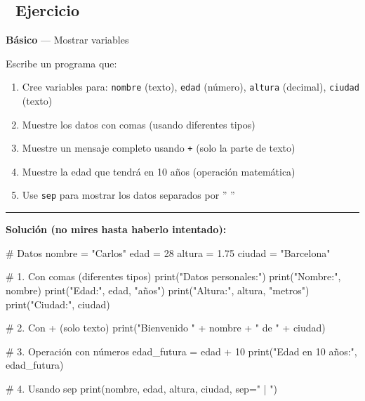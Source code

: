 \documentclass[
  doc,
  floatsintext,
  longtable,
  a4paper,
  nolmodern,
  notxfonts,
  notimes,
  12pt,
  colorlinks=true,linkcolor=blue,citecolor=blue,urlcolor=blue]{apa7}
\newenvironment{Shaded}{\begin{snugshade}}{\end{snugshade}}
\newcommand{\BuiltInTok}[1]{\textcolor[rgb]{0.00,0.23,0.31}{#1}}
\newcommand{\CommentTok}[1]{\textcolor[rgb]{0.37,0.37,0.37}{#1}}
\newcommand{\DecValTok}[1]{\textcolor[rgb]{0.68,0.00,0.00}{#1}}
\newcommand{\FloatTok}[1]{\textcolor[rgb]{0.68,0.00,0.00}{#1}}
\newcommand{\NormalTok}[1]{\textcolor[rgb]{0.00,0.23,0.31}{#1}}
\newcommand{\OperatorTok}[1]{\textcolor[rgb]{0.37,0.37,0.37}{#1}}
\newcommand{\StringTok}[1]{\textcolor[rgb]{0.13,0.47,0.30}{#1}}
\providecommand{\tightlist}{%
  \setlength{\itemsep}{0pt}\setlength{\parskip}{0pt}}
\begin{document}
\subsection{📝 Ejercicio}\label{ejercicio}

\textbf{Básico} --- Mostrar variables

Escribe un programa que:

\begin{enumerate}
\def\labelenumi{\arabic{enumi}.}
\tightlist
\item
  Cree variables para: \texttt{nombre} (texto), \texttt{edad} (número),
  \texttt{altura} (decimal), \texttt{ciudad} (texto)
\item
  Muestre los datos con comas (usando diferentes tipos)
\item
  Muestre un mensaje completo usando \texttt{+} (solo la parte de texto)
\item
  Muestre la edad que tendrá en 10 años (operación matemática)
\item
  Use \texttt{sep} para mostrar los datos separados por '' \textbar{} ''
\end{enumerate}

\begin{center}\rule{0.5\linewidth}{0.5pt}\end{center}

\textbf{Solución (no mires hasta haberlo intentado):}

\begin{Shaded}
\begin{Highlighting}[]
\CommentTok{\# Datos}
\NormalTok{nombre }\OperatorTok{=} \StringTok{"Carlos"}
\NormalTok{edad }\OperatorTok{=} \DecValTok{28}
\NormalTok{altura }\OperatorTok{=} \FloatTok{1.75}
\NormalTok{ciudad }\OperatorTok{=} \StringTok{"Barcelona"}

\CommentTok{\# 1. Con comas (diferentes tipos)}
\BuiltInTok{print}\NormalTok{(}\StringTok{"Datos personales:"}\NormalTok{)}
\BuiltInTok{print}\NormalTok{(}\StringTok{"Nombre:"}\NormalTok{, nombre)}
\BuiltInTok{print}\NormalTok{(}\StringTok{"Edad:"}\NormalTok{, edad, }\StringTok{"años"}\NormalTok{)}
\BuiltInTok{print}\NormalTok{(}\StringTok{"Altura:"}\NormalTok{, altura, }\StringTok{"metros"}\NormalTok{)}
\BuiltInTok{print}\NormalTok{(}\StringTok{"Ciudad:"}\NormalTok{, ciudad)}

\CommentTok{\# 2. Con + (solo texto)}
\BuiltInTok{print}\NormalTok{(}\StringTok{"Bienvenido "} \OperatorTok{+}\NormalTok{ nombre }\OperatorTok{+} \StringTok{" de "} \OperatorTok{+}\NormalTok{ ciudad)}

\CommentTok{\# 3. Operación con números}
\NormalTok{edad\_futura }\OperatorTok{=}\NormalTok{ edad }\OperatorTok{+} \DecValTok{10}
\BuiltInTok{print}\NormalTok{(}\StringTok{"Edad en 10 años:"}\NormalTok{, edad\_futura)}

\CommentTok{\# 4. Usando sep}
\BuiltInTok{print}\NormalTok{(nombre, edad, altura, ciudad, sep}\OperatorTok{=}\StringTok{" | "}\NormalTok{)}
\end{Highlighting}
\end{Shaded}
\end{document}
